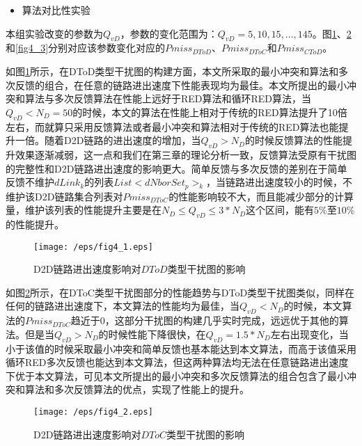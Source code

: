 \documentclass[figurelist,tablelist,algorithmlist,nomlist,masters]{seuthesix}
\begin{document}
	
	\begin{itemize}
		\item 算法对比性实验
	\end{itemize}
	
	本组实验改变的参数为$Q_{vD}$，参数的变化范围为：$Q_{vD} = 5,10,15,...,145$。图\ref{fig4_1}、\ref{fig4_2}和\ref{fig4_3}分别对应该参数变化对应的$Pmiss_{DToD}$、$Pmiss_{DToC}$和$Pmiss_{CToD}$。
	
	如图\ref{fig4_1}所示，在DToD类型干扰图的构建方面，本文所采取的最小冲突和算法和多次反馈的组合，在任意的链路进出速度下性能表现均为最佳。本文所提出的最小冲突和算法与多次反馈算法在性能上远好于RED算法和循环RED算法，当$Q_{vD} < N_D = 50$的时候，本文的算法在性能上相对于传统的RED算法提升了10倍左右，而就算只采用反馈算法或者最小冲突和算法相对于传统的RED算法也能提升一倍。随着D2D链路的进出速度的增加，当$Q_{vD} > N_D$的时候反馈算法的性能提升效果逐渐减弱，这一点和我们在第三章的理论分析一致，反馈算法受原有干扰图的完整性和D2D链路进出速度的影响更大。简单反馈与多次反馈的差别在于简单反馈不维护$dLink_k$的列表$List < dNborSet_{p}{ > _k}$，当链路进出速度较小的时候，不维护该D2D链路集合列表对$Pmiss_{DToC}$的性能影响较不大，而且能减少部分的计算量，维护该列表的性能提升主要是在$N_D \le Q_{vD} \le 3 * N_D$这个区间，能有$5\%$至$10\%$的性能提升。
	
	\begin{figure}[!h]
		\centering
		\texttt{[image: /eps/fig4\_1.eps]}
		\caption{D2D链路进出速度影响对$DToD$类型干扰图的影响}
		\label{fig4_1}
	\end{figure}
	
	如图\ref{fig4_2}所示，在DToC类型干扰图部分的性能趋势与DToD类型干扰图类似，同样在任何的链路进出速度下，本文算法的性能均为最佳，当$Q_{vD} < N_D$的时候，本文算法的$Pmiss_{DToC}$趋近于0，这部分干扰图的构建几乎实时完成，远远优于其他的算法。但是当$Q_{vD} > N_D$的时候性能下降很快，在$Q_{vD} = 1.5 * N_D$左右出现变化，当小于该值的时候采取最小冲突和简单反馈也基本能达到本文算法，而高于该值采用循环RED多次反馈也能达到本文算法，但这两种算法均无法在任意链路进出速度下优于本文算法，可见本文所提出的最小冲突和多次反馈算法的组合包含了最小冲突和算法和多次反馈算法的优点，实现了性能上的提升。
	
	\begin{figure}[!h]
		\centering
		\texttt{[image: /eps/fig4\_2.eps]}
		\caption{D2D链路进出速度影响对$DToC$类型干扰图的影响}
		\label{fig4_2}
	\end{figure}
	
\end{document}
